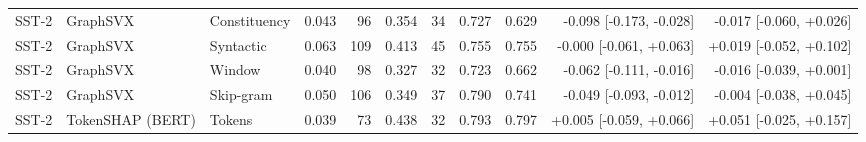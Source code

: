 \begin{table}[H]
\begin{tabular}{lllrrrrrrrr}
SST-2 & GraphSVX & Constituency & 0.043 & 96 & 0.354 & 34 & 0.727 & 0.629 & -0.098 [-0.173, -0.028] & -0.017 [-0.060, +0.026] \\
SST-2 & GraphSVX & Syntactic & 0.063 & 109 & 0.413 & 45 & 0.755 & 0.755 & -0.000 [-0.061, +0.063] & +0.019 [-0.052, +0.102] \\
SST-2 & GraphSVX & Window & 0.040 & 98 & 0.327 & 32 & 0.723 & 0.662 & -0.062 [-0.111, -0.016] & -0.016 [-0.039, +0.001] \\
SST-2 & GraphSVX & Skip-gram & 0.050 & 106 & 0.349 & 37 & 0.790 & 0.741 & -0.049 [-0.093, -0.012] & -0.004 [-0.038, +0.045] \\
SST-2 & TokenSHAP (BERT) & Tokens & 0.039 & 73 & 0.438 & 32 & 0.793 & 0.797 & +0.005 [-0.059, +0.066] & +0.051 [-0.025, +0.157] \\
\bottomrule
\end{tabular}
\end{table}

